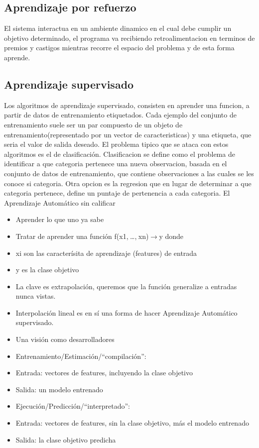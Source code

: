 \documentclass[a4paper,12pt,spanish]{book}
\begin{document}
    \subsection{Aprendizaje por refuerzo}
      El sistema interactua en un ambiente dinamico en el cual debe cumplir un objetivo determinado, el programa va recibiendo retroalimentacion en terminos de premios y castigos mientras 
      recorre el espacio del problema y de esta forma aprende.

    \subsection{Aprendizaje supervisado}
      Los algoritmos de aprendizaje supervisado, consisten en aprender una funcion, a partir de datos de entrenamiento etiquetados. Cada ejemplo del conjunto de entrenamiento suele ser un par
      compuesto de un objeto de entrenamiento(representado por un vector de caracteristicas) y una etiqueta, que seria el valor de salida deseado.
      El problema tipico que se ataca con estos algoritmos es el de clasificación. Clasificacion se define como el problema de identificar a que categoria pertenece una nueva observacion,
      basada en el conjunto de datos de entrenamiento, que contiene observaciones a las cuales se les conoce si categoria.
      Otra opcion es la regresion que en lugar de determinar a que categoria pertenece, define un puntaje de pertenencia a cada categoria.
      El Aprendizaje Automático sin calificar
      \begin{itemize}
	\item Aprender lo que uno ya sabe
	\item Tratar de aprender una función f(x1, …, xn) → y donde
	\item xi son las caracterísita de aprendizaje (features) de entrada
	\item y es la clase objetivo
	\item La clave es extrapolación, queremos que la función generalize a entradas nunca vistas.
	\item Interpolación lineal es en sí una forma de hacer Aprendizaje Automático supervisado.
	\item Una visión como desarrolladores
	\item Entrenamiento/Estimación/“compilación”:
	\item Entrada: vectores de features, incluyendo la clase objetivo
	\item Salida: un modelo entrenado
	\item Ejecución/Predicción/“interpretado”:
	\item Entrada: vectores de features, sin la clase objetivo, más el modelo entrenado
	\item Salida: la clase objetivo predicha
      \end{itemize}
      
\end{document}
